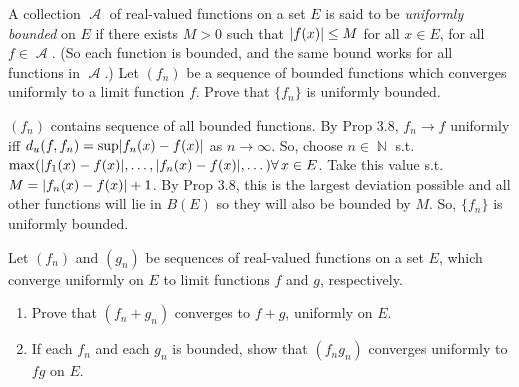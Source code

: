 \documentclass[12pt,letterpaper,boxed]{hmcpset}
\DeclareMathOperator{\A}{\mathcal{A}}
\DeclareMathOperator{\N}{\mathbb{N}}
\DeclarePairedDelimiter\abs{\lvert}{\rvert}%
\begin{document}

\begin{problem}[Exercise 3.9]
A collection $\A$ of real-valued functions on a set $E$ is said to be \textit{uniformly bounded} on $E$ if there exists $M > 0$ such that $\abs{f(x)} \leq M$ for all $x \in E$, for all $f\in\A.$ (So each function is bounded, and the same bound works for all functions in $\A$.) Let $(f_n)$ be a sequence of bounded functions which converges uniformly to a limit function $f$. Prove that $\{f_n\}$ is uniformly bounded.
\end{problem}

\begin{solution}
$(f_n)$ contains sequence of all bounded functions. By Prop 3.8, $f_n \rightarrow f$ uniformly iff $d_u(f, f_n) = \sup \abs{f_n(x) - f(x)}$ as $n\rightarrow\infty$. So, choose $n\in\N$ s.t. $\max(\abs{f_1(x) - f(x)}, \dots, \abs{f_n(x) - f(x)}, \dots) \forall \, x \in E$. Take this value s.t. $M = \abs{f_n(x) - f(x)} + 1$. By Prop 3.8, this is the largest deviation possible and all other functions will lie in $B(E)$ so they will also be bounded by $M$. So, $\{f_n\}$ is uniformly bounded.
\end{solution}

\begin{problem}[Exercise 3.10]
Let $(f_n)$ and $(g_n)$ be sequences of real-valued functions on a set $E$, which converge uniformly on $E$ to limit functions $f$ and $g$, respectively.
\begin{enumerate}
    \item Prove that $(f_n + g_n)$ converges to $f + g$, uniformly on $E$.
    \item If each $f_n$ and each $g_n$ is bounded, show that $(f_n g_n)$ converges uniformly to $fg$ on $E$.
\end{enumerate} 
\end{problem}
\end{document}
